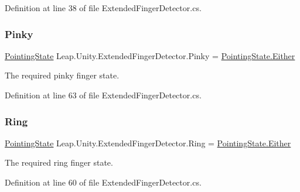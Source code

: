 Definition at line 38 of file Extended\+Finger\+Detector.\+cs.

\mbox{\label{class_leap_1_1_unity_1_1_extended_finger_detector_a8cb8f984382c8c7fae991073aa7ff232}} 
\subsubsection{\texorpdfstring{Pinky}{Pinky}}
{\footnotesize\ttfamily \mbox{\hyperlink{namespace_leap_1_1_unity_a1d316bf483102971171646a20de176fc}{Pointing\+State}} Leap.\+Unity.\+Extended\+Finger\+Detector.\+Pinky = \mbox{\hyperlink{namespace_leap_1_1_unity_a1d316bf483102971171646a20de176fca9e70a5d3dab1960c04b55a29f310331e}{Pointing\+State.\+Either}}}

The required pinky finger state. 

Definition at line 63 of file Extended\+Finger\+Detector.\+cs.

\mbox{\label{class_leap_1_1_unity_1_1_extended_finger_detector_a08e096dca12e0dc50f7ddf831cdff192}} 
\subsubsection{\texorpdfstring{Ring}{Ring}}
{\footnotesize\ttfamily \mbox{\hyperlink{namespace_leap_1_1_unity_a1d316bf483102971171646a20de176fc}{Pointing\+State}} Leap.\+Unity.\+Extended\+Finger\+Detector.\+Ring = \mbox{\hyperlink{namespace_leap_1_1_unity_a1d316bf483102971171646a20de176fca9e70a5d3dab1960c04b55a29f310331e}{Pointing\+State.\+Either}}}

The required ring finger state. 

Definition at line 60 of file Extended\+Finger\+Detector.\+cs.

\mbox{\label{class_leap_1_1_unity_1_1_extended_finger_detector_ae8f83315871432527c288cdfef9f7d4b}} 
